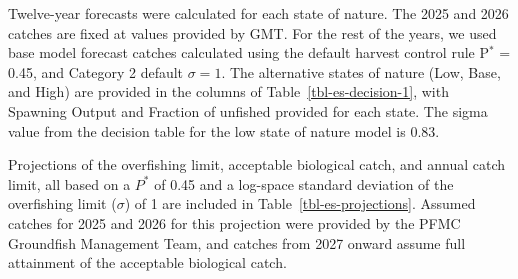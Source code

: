\documentclass[
  english,
]{article}
\begin{document}
Twelve-year forecasts were calculated for each state of nature. The 2025
and 2026 catches are fixed at values provided by GMT. For the rest of
the years, we used base model forecast catches calculated using the
default harvest control rule P\(^*\) = 0.45, and Category 2 default
\(\sigma = 1\). The alternative states of nature (Low, Base, and High)
are provided in the columns of Table~\ref{tbl-es-decision-1}, with
Spawning Output and Fraction of unfished provided for each state. The
sigma value from the decision table for the low state of nature model is
0.83.

Projections of the overfishing limit, acceptable biological catch, and
annual catch limit, all based on a \(P^*\) of 0.45 and a log-space
standard deviation of the overfishing limit (\(\sigma\)) of 1 are
included in Table~\ref{tbl-es-projections}. Assumed catches for 2025 and
2026 for this projection were provided by the PFMC Groundfish Management
Team, and catches from 2027 onward assume full attainment of the
acceptable biological catch.
\end{document}
